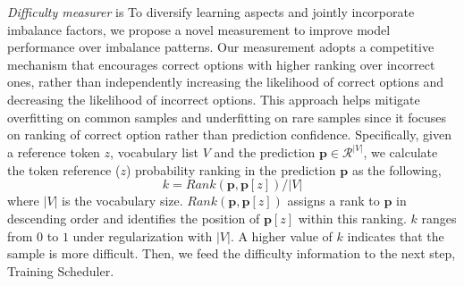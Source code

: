 \documentclass[sn-mathphys-num]{sn-jnl}%
\theoremstyle{thmstyleone}%
\theoremstyle{thmstyletwo}%
\theoremstyle{thmstylethree}%
\begin{document}
\textit{Difficulty measurer} is 
To diversify learning aspects and jointly incorporate imbalance factors, we propose a novel measurement to improve model performance over imbalance patterns. 
Our measurement adopts a competitive mechanism that encourages correct options with higher ranking over incorrect ones, rather than independently increasing the likelihood of correct options and decreasing the likelihood of incorrect options. This approach helps mitigate overfitting on common samples and underfitting on rare samples since it focuses on ranking of correct option rather than prediction confidence.
Specifically, given a reference token $z$, vocabulary list $V$ and the prediction $\mathbf{p} \in \mathcal{R}^{|V|}$, we calculate the token reference ($z$) probability ranking in the prediction $\mathbf{p} $ as the following,
\begin{equation}\label{eq:Difficulty}
    k = Rank(\mathbf{p}, \mathbf{p}[z])/ |V|
\end{equation}
where $|V|$ is the vocabulary size. 
$Rank(\mathbf{p}, \mathbf{p}[z])$ assigns a rank to $\mathbf{p}$ in descending order and identifies the position of $\mathbf{p}[z]$ within this ranking.
$k$ ranges from $0$ to $1$ under regularization with $|V|$. A higher value of $k$ indicates that the sample is more difficult.
Then, we feed the difficulty information to the next step, Training Scheduler.
\end{document}
